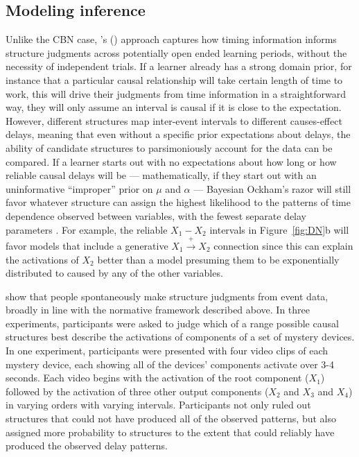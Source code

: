 \documentclass{cambridge7A}%
\def\citeapos#1{\citeauthor{#1}'s (\citeyear{#1})}
\begin{document}
\subsection{Modeling inference}

Unlike the CBN case, \citeapos{bramley2018time} approach captures how timing information informs structure judgments across potentially open ended learning periods, without the necessity of independent trials.  If a learner already has a strong domain prior, for instance that a particular causal relationship will take certain length of time to work, this will drive their judgments from time information in a straightforward way, they will only assume an interval is causal if it is close to the expectation.  However, different structures map inter-event intervals to different causes-effect delays, meaning that even without a specific prior expectations about delays, the ability of candidate structures to parsimoniously account for the data can be compared.  If a learner starts out with no expectations about how long or how reliable causal delays will be --- mathematically, if they start out with an uninformative ``improper'' prior on $\mu$ and $\alpha$ --- Bayesian Ockham's razor will still favor whatever structure can assign the highest likelihood to the patterns of time dependence observed between variables, with the fewest separate delay parameters \citep{bramley2018time}.   For example, the reliable $X_1-X_2$ intervals %
in Figure~\ref{fig:DN}b will favor models that include a generative $X_1\!\stackrel{+}\rightarrow\!X_2$ connection since this can explain the activations of $X_2$ better than a model presuming them to be exponentially distributed to caused by any of the other variables.   %

\cite{bramley2018time} show that people spontaneously make structure judgments from event data, broadly in line with the normative framework described above.  In three experiments, participants were asked to judge which of a range possible causal structures best describe the activations of components of a set of mystery devices.    In one experiment, participants were presented with four video clips of each mystery device, each showing all of the devices' components activate over 3-4 seconds.  Each video begins with the activation of the root component ($X_1$) followed by the activation of three other output components ($X_2$ and $X_3$ and $X_4$) in varying orders with varying intervals.  Participants not only ruled out structures that could not have produced all of the observed patterns, but also assigned more probability to structures to the extent that could reliably have produced the observed delay patterns. %
\end{document}
